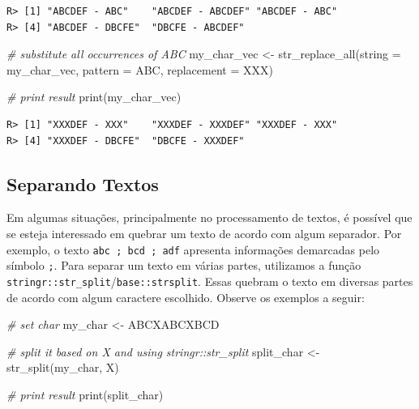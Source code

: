\documentclass[
  11pt,
]{book}
\newenvironment{Shaded}{\begin{snugshade}}{\end{snugshade}}
\newcommand{\AttributeTok}[1]{\textcolor[rgb]{0.61,0.61,0.61}{#1}}
\newcommand{\CommentTok}[1]{\textcolor[rgb]{0.37,0.37,0.37}{\textit{#1}}}
\newcommand{\FunctionTok}[1]{\textcolor[rgb]{0,0,0}{#1}}
\newcommand{\NormalTok}[1]{#1}
\newcommand{\OtherTok}[1]{\textcolor[rgb]{0.37,0.37,0.37}{#1}}
\newcommand{\StringTok}[1]{\textcolor[rgb]{0.5,0.5,0.5}{#1}}
\begin{document}
\begin{verbatim}
R> [1] "ABCDEF - ABC"    "ABCDEF - ABCDEF" "ABCDEF - ABC"   
R> [4] "ABCDEF - DBCFE"  "DBCFE - ABCDEF"
\end{verbatim}

\begin{Shaded}
\begin{Highlighting}[]
\CommentTok{\# substitute all occurrences of \textquotesingle{}ABC\textquotesingle{}}
\NormalTok{my\_char\_vec }\OtherTok{\textless{}{-}} \FunctionTok{str\_replace\_all}\NormalTok{(}\AttributeTok{string =}\NormalTok{ my\_char\_vec,}
                               \AttributeTok{pattern =} \StringTok{\textquotesingle{}ABC\textquotesingle{}}\NormalTok{,}
                               \AttributeTok{replacement =} \StringTok{\textquotesingle{}XXX\textquotesingle{}}\NormalTok{)}

\CommentTok{\# print result}
\FunctionTok{print}\NormalTok{(my\_char\_vec)}
\end{Highlighting}
\end{Shaded}

\begin{verbatim}
R> [1] "XXXDEF - XXX"    "XXXDEF - XXXDEF" "XXXDEF - XXX"   
R> [4] "XXXDEF - DBCFE"  "DBCFE - XXXDEF"
\end{verbatim}

\hypertarget{separando-textos}{%
\subsection{Separando Textos}\label{separando-textos}}

Em algumas situações, principalmente no processamento de textos, é possível que se esteja interessado em quebrar um texto de acordo com algum separador. Por exemplo, o texto \texttt{abc\ ;\ bcd\ ;\ adf} apresenta informações demarcadas pelo símbolo \texttt{;}. Para separar um texto em várias partes, utilizamos a função \texttt{stringr::str\_split}/\texttt{base::strsplit}. Essas quebram o texto em diversas partes de acordo com algum caractere escolhido. Observe os exemplos a seguir: 

\begin{Shaded}
\begin{Highlighting}[]
\CommentTok{\# set char}
\NormalTok{my\_char }\OtherTok{\textless{}{-}} \StringTok{\textquotesingle{}ABCXABCXBCD\textquotesingle{}}

\CommentTok{\# split it based on \textquotesingle{}X\textquotesingle{} and using stringr::str\_split}
\NormalTok{split\_char }\OtherTok{\textless{}{-}} \FunctionTok{str\_split}\NormalTok{(my\_char, }\StringTok{\textquotesingle{}X\textquotesingle{}}\NormalTok{)}

\CommentTok{\# print result}
\FunctionTok{print}\NormalTok{(split\_char)}
\end{Highlighting}
\end{Shaded}
\end{document}
